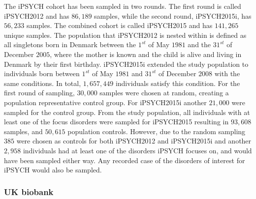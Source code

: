 The iPSYCH cohort has been sampled in two rounds. The first round is called iPSYCH2012 and has $ 86,189 $ samples, while the second round, iPSYCH2015i, has $ 56,233 $ samples. The combined cohort is called iPSYCH2015 and has $ 141,265 $ unique samples. The population that iPSYCH2012 is nested within is defined as all singletons born in Denmark between the $ 1^{st} $ of May $ 1981 $ and the $ 31^{st} $ of December $ 2005 $, where the mother is known and the child is alive and living in Denmark by their first birthday. iPSYCH2015i extended the study population to individuals born between $ 1^{st} $ of May $ 1981 $ and $ 31^{st} $ of December $ 2008 $ with the same conditions. In total, $ 1,657,449 $ individuals satisfy this condition. For the first round of sampling, $ 30,000 $ samples were chosen at random, creating a population representative control group. For iPSYCH2015i another $ 21,000 $ were sampled for the control group. From the study population, all individuals with at least one of the focus disorders were sampled for iPSYCH2015 resulting in $ 93,608 $ samples, and $ 50,615 $ population controls. However, due to the random sampling $ 385 $ were chosen as controls for both iPSYCH2012 and iPSYCH2015i and another $ 2,958 $ individuals had at least one of the disorders iPSYCH focuses on, and would have been sampled either way. Any recorded case of the disorders of interest for iPSYCH would also be sampled\cite{pedersen2018ipsych2012,bybjerg2020ipsych2015}.

\subsubsection{UK biobank}

